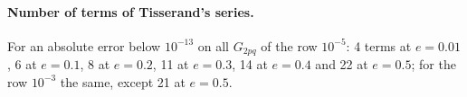 \paragraph{Number of terms of Tisserand's series.} For an absolute error below $10^{-13}$ on all $G_{2pq}$ of the row $10^{-5}$: 4 terms at $e=0.01$, 6 at $e=0.1$, 8 at $e=0.2$, 11 at $e=0.3$, 14 at $e=0.4$ and 22 at $e=0.5$; for the row $10^{-3}$ the same, except 21 at $e=0.5$.
